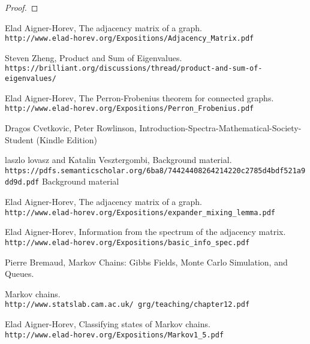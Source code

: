 \documentclass[a4paper, 11pt, oneside]{article}
\newenvironment{problem}[1]
  {\renewcommand\theinnercustomprob{#1}\innercustomprob}
  {\endinnercustomprob}
\begin{document}
 \begin{problem}{11}\label{problem11}
\end{problem}
\begin{proof}

\end{proof}		

\begin{thebibliography}{9} 
Elad Aigner-Horev,
The adjacency matrix of a graph.
\\\texttt{http://www.elad-horev.org/Expositions/Adjacency\_Matrix.pdf}

Steven Zheng,
Product and Sum of Eigenvalues.
\\\texttt{https://brilliant.org/discussions/thread/product-and-sum-of-eigenvalues/}

Elad Aigner-Horev,
The Perron-Frobenius theorem for connected graphs.
\\\texttt{http://www.elad-horev.org/Expositions/Perron\_Frobenius.pdf}

Dragos Cvetkovic, Peter Rowlinson,
Introduction-Spectra-Mathematical-Society-Student (Kindle Edition)

laszlo lovasz and Katalin Vesztergombi,
Background material.
\\\texttt{https://pdfs.semanticscholar.org/6ba8/74424408264214220c2785d4bdf521a9dd9d.pdf}
Background material

Elad Aigner-Horev,
The adjacency matrix of a graph.
\\\texttt{http://www.elad-horev.org/Expositions/expander\_mixing\_lemma.pdf}

Elad Aigner-Horev,
Information from the spectrum of the adjacency matrix.
\\\texttt{http://www.elad-horev.org/Expositions/basic\_info\_spec.pdf}

Pierre Bremaud,
Markov Chains: Gibbs Fields, Monte Carlo Simulation, and Queues.

Markov chains.
\\\texttt{http://www.statslab.cam.ac.uk/~grg/teaching/chapter12.pdf}

Elad Aigner-Horev,
Classifying states of Markov chains.
\\\texttt{http://www.elad-horev.org/Expositions/Markov1\_5.pdf}
\end{thebibliography}
\end{document}
